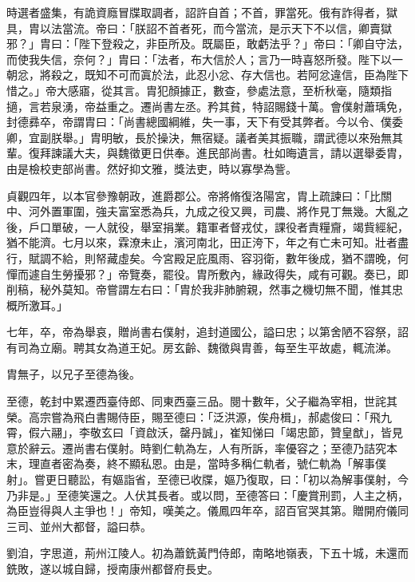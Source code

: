 \begin{pinyinscope}
 時選者盛集，有詭資廕冒牒取調者，詔許自首；不首，罪當死。俄有詐得者，獄具，胄以法當流。帝曰：「朕詔不首者死，而今當流，是示天下不以信，卿賣獄邪？」胄曰：「陛下登殺之，非臣所及。既屬臣，敢虧法乎？」帝曰：「卿自守法，而使我失信，奈何？」胄曰：「法者，布大信於人；言乃一時喜怒所發。陛下以一朝忿，將殺之，既知不可而寘於法，此忍小忿、存大信也。若阿忿違信，臣為陛下惜之。」帝大感寤，從其言。胄犯顏據正，數查，參處法意，至析秋毫，隨類指擿，言若泉湧，帝益重之。遷尚書左丞。矜其貧，特詔賜錢十萬。會僕射蕭瑀免，封德彞卒，帝謂胄曰：「尚書總國綱維，失一事，天下有受其弊者。今以令、僕委卿，宜副朕舉。」胄明敏，長於操決，無宿疑。議者美其振職，謂武德以來殆無其輩。復拜諫議大夫，與魏徵更日供奉。進民部尚書。杜如晦遺言，請以選舉委胄，由是檢校吏部尚書。然好抑文雅，獎法吏，時以寡學為訾。



 貞觀四年，以本官參豫朝政，進爵郡公。帝將脩復洛陽宮，胄上疏諫曰：「比關中、河外置軍圍，強夫富室悉為兵，九成之役又興，司農、將作見丁無幾。大亂之後，戶口單破，一人就役，舉室捐業。籍軍者督戎仗，課役者責糧齎，竭貲經紀，猶不能濟。七月以來，霖潦未止，濱河南北，田正洿下，年之有亡未可知。壯者盡行，賦調不給，則帑藏虛矣。今宮殿足庇風雨、容羽衛，數年後成，猶不謂晚，何憚而遽自生勞擾邪？」帝覽奏，罷役。胄所敷內，緣政得失，咸有可觀。奏已，即削稿，秘外莫知。帝嘗謂左右曰：「胄於我非肺腑親，然事之機切無不聞，惟其忠概所激耳。」



 七年，卒，帝為舉哀，贈尚書右僕射，追封道國公，謚曰忠；以第舍陋不容祭，詔有司為立廟。聘其女為道王妃。房玄齡、魏徵與胄善，每至生平故處，輒流涕。



 胄無子，以兄子至德為後。



 至德，乾封中累遷西臺侍郎、同東西臺三品。閱十數年，父子繼為宰相，世詫其榮。高宗嘗為飛白書賜侍臣，賜至德曰：「泛洪源，俟舟楫」，郝處俊曰：「飛九霄，假六翮」，李敬玄曰「資啟沃，罄丹誠」，崔知悌曰「竭忠節，贊皇猷」，皆見意於辭云。遷尚書右僕射。時劉仁軌為左，人有所訴，率優容之；至德乃詰究本末，理直者密為奏，終不顯私恩。由是，當時多稱仁軌者，號仁軌為「解事僕射」。嘗更日聽訟，有嫗詣省，至德已收牒，嫗乃復取，曰：「初以為解事僕射，今乃非是。」至德笑還之。人伏其長者。或以問，至德答曰：「慶賞刑罰，人主之柄，為臣豈得與人主爭也！」帝知，嘆美之。儀鳳四年卒，詔百官哭其第。贈開府儀同三司、並州大都督，謚曰恭。



 劉洎，字思道，荊州江陵人。初為蕭銑黃門侍郎，南略地嶺表，下五十城，未還而銑敗，遂以城自歸，授南康州都督府長史。




\end{pinyinscope}
